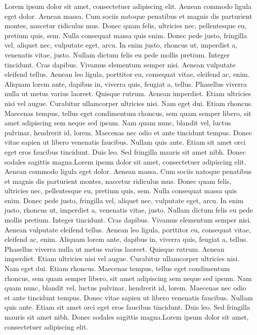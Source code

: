 \documentclass[]{book}
\begin{document}
Lorem ipsum dolor sit amet, consectetuer adipiscing elit. Aenean commodo
ligula eget dolor. Aenean massa. Cum sociis natoque penatibus et magnis
dis parturient montes, nascetur ridiculus mus. Donec quam felis,
ultricies nec, pellentesque eu, pretium quis, sem. Nulla consequat massa
quis enim. Donec pede justo, fringilla vel, aliquet nec, vulputate eget,
arcu. In enim justo, rhoncus ut, imperdiet a, venenatis vitae, justo.
Nullam dictum felis eu pede mollis pretium. Integer tincidunt. Cras
dapibus. Vivamus elementum semper nisi. Aenean vulputate eleifend
tellus. Aenean leo ligula, porttitor eu, consequat vitae, eleifend ac,
enim. Aliquam lorem ante, dapibus in, viverra quis, feugiat a, tellus.
Phasellus viverra nulla ut metus varius laoreet. Quisque rutrum. Aenean
imperdiet. Etiam ultricies nisi vel augue. Curabitur ullamcorper
ultricies nisi. Nam eget dui. Etiam rhoncus. Maecenas tempus, tellus
eget condimentum rhoncus, sem quam semper libero, sit amet adipiscing
sem neque sed ipsum. Nam quam nunc, blandit vel, luctus pulvinar,
hendrerit id, lorem. Maecenas nec odio et ante tincidunt tempus. Donec
vitae sapien ut libero venenatis faucibus. Nullam quis ante. Etiam sit
amet orci eget eros faucibus tincidunt. Duis leo. Sed fringilla mauris
sit amet nibh. Donec sodales sagittis magna.Lorem ipsum dolor sit amet,
consectetuer adipiscing elit. Aenean commodo ligula eget dolor. Aenean
massa. Cum sociis natoque penatibus et magnis dis parturient montes,
nascetur ridiculus mus. Donec quam felis, ultricies nec, pellentesque
eu, pretium quis, sem. Nulla consequat massa quis enim. Donec pede
justo, fringilla vel, aliquet nec, vulputate eget, arcu. In enim justo,
rhoncus ut, imperdiet a, venenatis vitae, justo. Nullam dictum felis eu
pede mollis pretium. Integer tincidunt. Cras dapibus. Vivamus elementum
semper nisi. Aenean vulputate eleifend tellus. Aenean leo ligula,
porttitor eu, consequat vitae, eleifend ac, enim. Aliquam lorem ante,
dapibus in, viverra quis, feugiat a, tellus. Phasellus viverra nulla ut
metus varius laoreet. Quisque rutrum. Aenean imperdiet. Etiam ultricies
nisi vel augue. Curabitur ullamcorper ultricies nisi. Nam eget dui.
Etiam rhoncus. Maecenas tempus, tellus eget condimentum rhoncus, sem
quam semper libero, sit amet adipiscing sem neque sed ipsum. Nam quam
nunc, blandit vel, luctus pulvinar, hendrerit id, lorem. Maecenas nec
odio et ante tincidunt tempus. Donec vitae sapien ut libero venenatis
faucibus. Nullam quis ante. Etiam sit amet orci eget eros faucibus
tincidunt. Duis leo. Sed fringilla mauris sit amet nibh. Donec sodales
sagittis magna.Lorem ipsum dolor sit amet, consectetuer adipiscing elit.
\end{document}
